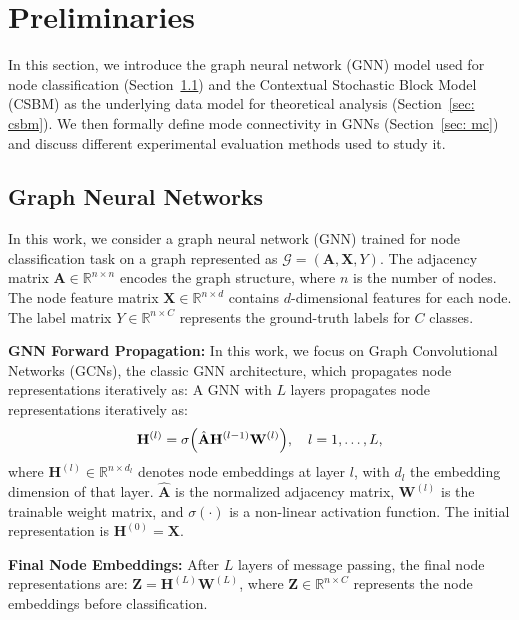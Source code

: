

\section{Preliminaries}
\label{sec: pre}

In this section, we introduce the graph neural network (GNN) model used for node classification (Section~\ref{sec: gnn}) and the Contextual Stochastic Block Model (CSBM) as the underlying data model for theoretical analysis (Section~\ref{sec: csbm}). We then formally define mode connectivity in GNNs (Section~\ref{sec: mc}) and discuss different experimental evaluation methods used to study it.

\subsection{Graph Neural Networks}
\label{sec: gnn}

In this work, we consider a graph neural network (GNN) trained for node classification task on a graph represented as $\mathcal{G} = (\mathbf{A}, \mathbf{X}, Y)$. The adjacency matrix $\mathbf{A} \in \mathbb{R}^{n \times n}$ encodes the graph structure, where $n$ is the number of nodes. The node feature matrix $\mathbf{X} \in \mathbb{R}^{n \times d}$ contains $d$-dimensional features for each node. The label matrix $Y \in \mathbb{R}^{n \times C}$ represents the ground-truth labels for $C$ classes.


\noindent\textbf{GNN Forward Propagation:}  
In this work, we focus on Graph Convolutional Networks (GCNs)\cite{kipf2016semi}, the classic GNN architecture, which propagates node representations iteratively as:
A GNN with $L$ layers propagates node representations iteratively as:
\begin{equation}
    \mathbf{H}^{(l)} = \sigma\Bigl(\hat{\mathbf{A}} \mathbf{H}^{(l-1)} \mathbf{W}^{(l)}\Bigr), \quad l = 1, \dots, L,
\end{equation}
where $\mathbf{H}^{(l)} \in \mathbb{R}^{n \times d_l}$ denotes node embeddings at layer $l$, with $d_l$ the embedding dimension of that layer. $\hat{\mathbf{A}}$ is the normalized adjacency matrix, $\mathbf{W}^{(l)}$ is the trainable weight matrix, and $\sigma(\cdot)$ is a non-linear activation function. The initial representation is $\mathbf{H}^{(0)} = \mathbf{X}$.

\noindent\textbf{Final Node Embeddings:}  
After $L$ layers of message passing, the final node representations are: $\mathbf{Z} = \mathbf{H}^{(L)} \mathbf{W}^{(L)}$,
where $\mathbf{Z} \in \mathbb{R}^{n \times C}$ represents the node embeddings before classification.

